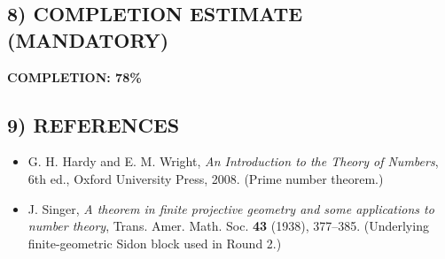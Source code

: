 \subsection*{8) COMPLETION ESTIMATE (MANDATORY)}
\textbf{COMPLETION: 78\%}

\subsection*{9) REFERENCES}
\begin{itemize}
\item G. H. Hardy and E. M. Wright, \emph{An Introduction to the Theory of Numbers}, 6th ed., Oxford University Press, 2008.  (Prime number theorem.)
\item J. Singer, \emph{A theorem in finite projective geometry and some applications to number theory}, Trans. Amer. Math. Soc. \textbf{43} (1938), 377--385.  (Underlying finite-geometric Sidon block used in Round 2.)
\end{itemize}
